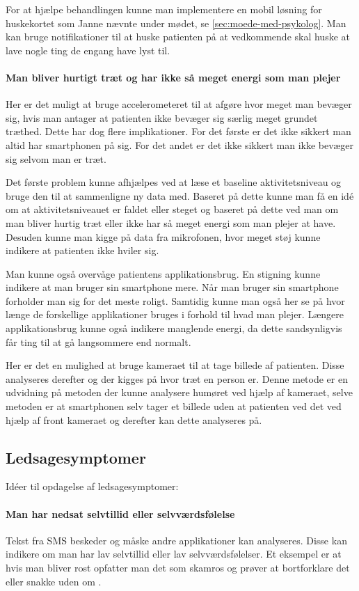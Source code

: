 For at hjælpe behandlingen kunne man implementere en mobil løsning for huskekortet som Janne nævnte under mødet, se \cref{sec:moede-med-psykolog}. Man kan bruge notifikationer til at huske patienten på at vedkommende skal huske at lave nogle ting de engang have lyst til.

\paragraph{Man bliver hurtigt træt og har ikke så meget energi som man plejer}
Her er det muligt at bruge accelerometeret til at afgøre hvor meget man bevæger sig, hvis man antager at patienten ikke bevæger sig særlig meget grundet træthed. Dette har dog flere implikationer. For det første er det ikke sikkert man altid har smartphonen på sig. For det andet er det ikke sikkert man ikke bevæger sig selvom man er træt.

Det første problem kunne afhjælpes ved at læse et baseline aktivitetsniveau og bruge den til at sammenligne ny data med. Baseret på dette kunne man få en idé om at aktivitetsniveauet er faldet eller steget og baseret på dette ved man om man bliver hurtig træt eller ikke har så meget energi som man plejer at have. 
Desuden kunne man kigge på data fra mikrofonen, hvor meget støj kunne indikere at patienten ikke hviler sig.

Man kunne også overvåge patientens applikationsbrug. 
En stigning kunne indikere at man bruger sin smartphone mere. 
Når man bruger sin smartphone forholder man sig for det meste roligt.
Samtidig kunne man også her se på hvor længe de forskellige applikationer bruges i forhold til hvad man plejer.
Længere applikationsbrug kunne også indikere manglende energi, da dette sandsynligvis får ting til at gå langsommere end normalt.

Her er det en mulighed at bruge kameraet til at tage billede af patienten. Disse analyseres derefter og der kigges på hvor træt en person er. 
Denne metode er en udvidning på metoden der kunne analysere humøret ved hjælp af kameraet, selve metoden er at smartphonen selv tager et billede uden at patienten ved det ved hjælp af front kameraet og derefter kan dette analyseres på.

\subsection{Ledsagesymptomer}\label{depr_ledsage}
Idéer til opdagelse af ledsagesymptomer:
\paragraph{Man har nedsat selvtillid eller selvværdsfølelse}
Tekst fra SMS beskeder og måske andre applikationer kan analyseres. Disse kan indikere om man har lav selvtillid eller lav selvværdsfølelser. Et eksempel er at hvis man bliver rost opfatter man det som skamros og prøver at bortforklare det eller snakke uden om \citep{selvtillid}.

